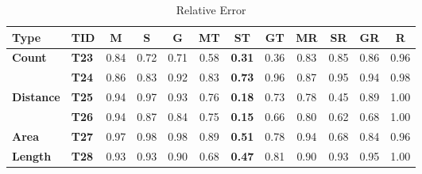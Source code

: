 \begin{table}
\caption{Relative Error}
\label{tab:relative_error}
\begin{tabular}{l|l|cccccccccc}
\hline
\textbf{Type} & \textbf{TID} & \textbf{M} & \textbf{S} & \textbf{G} & \textbf{MT} & \textbf{ST} & \textbf{GT} & \textbf{MR} & \textbf{SR} & \textbf{GR} & \textbf{R} \\
\hline
\multicolumn{1}{l|}{\multirow{2}{*}{\textbf{Count}}} & \textbf{T23} & 0.84 & 0.72 & 0.71 & 0.58 & \textbf{0.31} & 0.36 & 0.83 & 0.85 & 0.86 & 0.96 \\
\multicolumn{1}{l|}{} & \textbf{T24} & 0.86 & 0.83 & 0.92 & 0.83 & \textbf{0.73} & 0.96 & 0.87 & 0.95 & 0.94 & 0.98 \\
\hline
\multicolumn{1}{l|}{\multirow{2}{*}{\textbf{Distance}}} & \textbf{T25} & 0.94 & 0.97 & 0.93 & 0.76 & \textbf{0.18} & 0.73 & 0.78 & 0.45 & 0.89 & 1.00 \\
\multicolumn{1}{l|}{} & \textbf{T26} & 0.94 & 0.87 & 0.84 & 0.75 & \textbf{0.15} & 0.66 & 0.80 & 0.62 & 0.68 & 1.00 \\
\hline
\multicolumn{1}{l|}{\textbf{Area}} & \textbf{T27} & 0.97 & 0.98 & 0.98 & 0.89 & \textbf{0.51} & 0.78 & 0.94 & 0.68 & 0.84 & 0.96 \\
\hline
\multicolumn{1}{l|}{\textbf{Length}} & \textbf{T28} & 0.93 & 0.93 & 0.90 & 0.68 & \textbf{0.47} & 0.81 & 0.90 & 0.93 & 0.95 & 1.00 \\
\hline
\end{tabular}
\end{table}